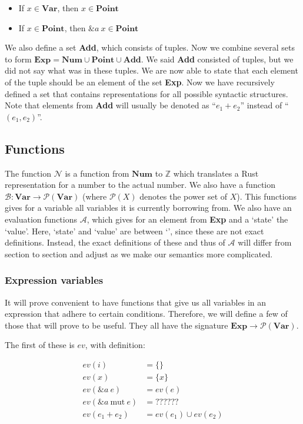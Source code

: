 \begin{itemize}[noitemsep]
    \item If $x \in \textbf{Var}$, then $x \in \textbf{Point}$
    \item If $x \in \textbf{Point}$, then $\&a~x \in \textbf{Point}$
\end{itemize}

We also define a set \textbf{Add}, which consists of tuples. Now we combine several sets to form $\textbf{Exp} = \textbf{Num} \cup \textbf{Point} \cup \textbf{Add}$. We said \textbf{Add} consisted of tuples, but we did not say what was in these tuples. We are now able to state that each element of the tuple should be an element of the set \textbf{Exp}. Now we have recursively defined a set that contains representations for all possible syntactic structures. Note that elements from \textbf{Add} will usually be denoted as ``$e_1 + e_2$'' instead of ``$(e_1, e_2)$''.

\subsection{Functions}
The function $
\mathcal{N}$ is a function from $\textbf{Num}$ to $\mathbb{Z}$ which translates a Rust representation for a number to the actual number. We also have a function $\mathcal{B}: \textbf{Var} \to \mathcal{P}(\textbf{Var})$ (where $\mathcal{P}(X)$ denotes the power set of $X$). This functions gives for a variable all variables it is currently borrowing from. We also have an evaluation functions $\mathcal{A}$, which gives for an element from \textbf{Exp} and a `state' the `value'. Here, `state' and `value' are between `', since these are not exact definitions. Instead, the exact definitions of these and thus of $\mathcal{A}$ will differ from section to section and adjust as we make our semantics more complicated. 

\subsubsection{Expression variables}
It will prove convenient to have functions that give us all variables in an expression that adhere to certain conditions. Therefore, we will define a few of those that will prove to be useful. They all have the signature $\textbf{Exp} \to \mathcal{P}(\textbf{Var})$.

The first of these is $ev$, with definition:

\begin{align*}
    ev(i)          &= \{\}
\\  ev(x)          &= \{x\}
\\  ev(\&a~e)          &= ev(e)
\\  ev(\&a~\textrm{mut}~e)          &= ??????
\\  ev(e_1 + e_2)          &= ev(e_1) \cup ev(e_2)
\end{align*}

